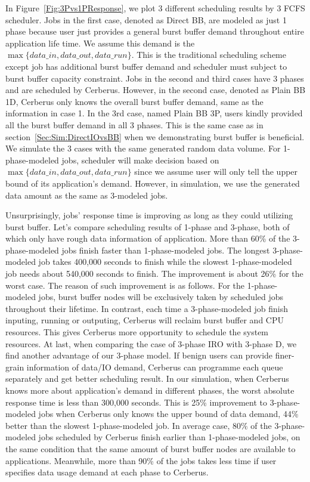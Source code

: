 In Figure~\ref{Fig:3Pvs1PResponse}, we plot 3 different scheduling results by 3 FCFS scheduler.
Jobs in the first case, denoted as Direct BB, are modeled as just 1 phase because user just provides
a general burst buffer demand throughout entire application life time.
We assume this demand is the $\max \{data\_in, data\_out, data\_run\}$.
This is the traditional scheduling scheme except job has additional
burst buffer demand and scheduler must subject to burst buffer capacity constraint.
Jobs in the second and third cases have 3 phases and are scheduled by Cerberus.
However, in the second case, denoted as Plain BB 1D, Cerberus only knows the overall burst buffer demand,
same as the information in case 1.
In the 3rd case, named Plain BB 3P, users kindly provided all the burst buffer demand in all 3 phases.
This is the same case as in section~\ref{Sec:Sim:DirectIOvsBB} when we demonstrating burst buffer is beneficial.
We simulate the 3 cases with the same generated random data volume.
For 1-phase-modeled jobs, scheduler will make decision based on $\max \{data\_in, data\_out, data\_run\}$
since we assume user will only tell the upper bound of its application's demand.
However, in simulation, we use the generated data amount as the same as 3-modeled jobs.

Unsurprisingly, jobs' response time is improving as long as they could utilizing burst buffer.
Let's compare scheduling results of 1-phase and 3-phase, both of which only have rough data information of application.
More than 60\% of the 3-phase-modeled jobs finish faster than 1-phase-modeled jobs.
The longest 3-phase-modeled job takes 400,000 seconds to finish while the slowest 1-phase-modeled job
needs about 540,000 seconds to finish.
The improvement is about 26\% for the worst case.
The reason of such improvement is as follows.
For the 1-phase-modeled jobs, burst buffer nodes will be exclusively taken by scheduled jobs
throughout their lifetime.
In contrast, each time a 3-phase-modeled job finish inputing, running or outputing,
Cerberus will reclaim burst buffer and CPU resources.
This gives Cerberus more opportunity to schedule the system resources.
At last, when comparing the case of 3-phase IRO with 3-phase D, we find another advantage of our 3-phase model.
If benign users can provide finer-grain information of data/IO demand,
Cerberus can programme each queue separately and get better scheduling result.
In our simulation, when Cerberus knows more about application's demand in different phases,
the worst absolute response time is less than 300,000 seconds.
This is 25\% improvement to 3-phase-modeled jobs when Cerberus only knows the upper bound of data demand,
44\% better than the slowest 1-phase-modeled job.
In average case, 80\% of the 3-phase-modeled jobs scheduled by Cerberus finish earlier than 1-phase-modeled jobs,
on the same condition that the same amount of burst buffer nodes are available to applications.
Meanwhile, more than 90\% of the jobs takes less time if user specifies data usage demand
at each phase to Cerberus.


